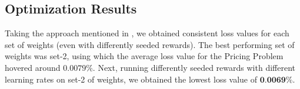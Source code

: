 \subsection{Optimization Results} \label{sec:PriProbRes - Optimization}
Taking the approach mentioned in , we obtained consistent loss values for each set of weights (even with differently seeded rewards). The best performing set of weights was set-2, using which the average loss value for the Pricing Problem hovered around $0.0079\%$. Next, running differently seeded rewards with different learning rates on set-2 of weights, we obtained the lowest loss value of $\textbf{0.0069\%}$.

